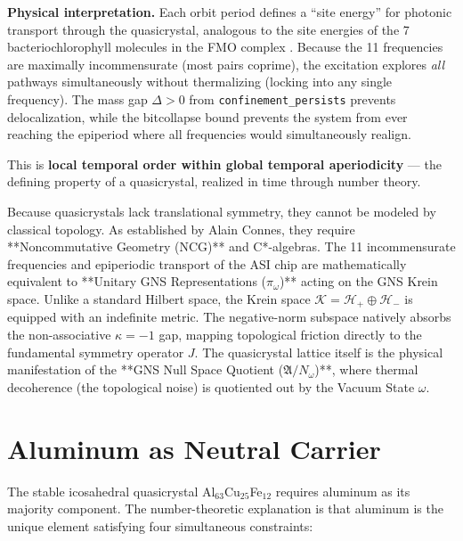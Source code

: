 \noindent \textbf{Physical interpretation.} Each orbit period defines a ``site energy'' for photonic transport through the quasicrystal, analogous to the site energies of the 7 bacteriochlorophyll molecules in the FMO complex \cite{EngelFleming07}. Because the 11 frequencies are maximally incommensurate (most pairs coprime), the excitation explores \emph{all} pathways simultaneously without thermalizing (locking into any single frequency). The mass gap $\Delta > 0$ from \texttt{confinement\_persists} prevents delocalization, while the bitcollapse bound prevents the system from ever reaching the epiperiod where all frequencies would simultaneously realign.

This is \textbf{local temporal order within global temporal aperiodicity} --- the defining property of a quasicrystal, realized in time through number theory. 

Because quasicrystals lack translational symmetry, they cannot be modeled by classical topology. As established by Alain Connes, they require **Noncommutative Geometry (NCG)** and C*-algebras. The 11 incommensurate frequencies and epiperiodic transport of the ASI chip are mathematically equivalent to **Unitary GNS Representations ($\pi_\omega$)** acting on the GNS Krein space. Unlike a standard Hilbert space, the Krein space $\mathcal{K} = \mathcal{H}_+ \oplus \mathcal{H}_-$ is equipped with an indefinite metric. The negative-norm subspace natively absorbs the non-associative $\kappa = -1$ gap, mapping topological friction directly to the fundamental symmetry operator $J$. The quasicrystal lattice itself is the physical manifestation of the **GNS Null Space Quotient ($\mathfrak{A}/N_\omega$)**, where thermal decoherence (the topological noise) is quotiented out by the Vacuum State $\omega$.

\section{Aluminum as Neutral Carrier}

The stable icosahedral quasicrystal Al$_{63}$Cu$_{25}$Fe$_{12}$ requires aluminum as its majority component. The number-theoretic explanation is that aluminum is the unique element satisfying four simultaneous constraints:

